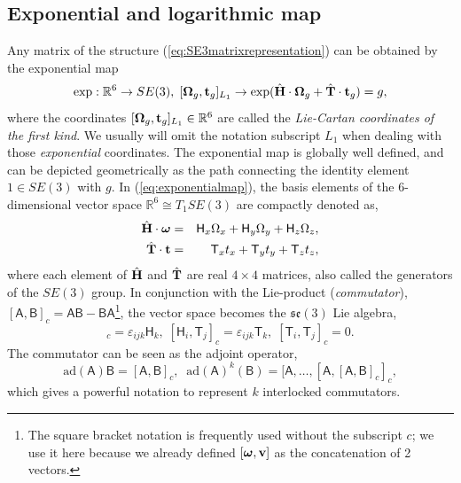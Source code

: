 \documentclass[journal]{IEEEtran}
\newcommand{\real}{\mathbb{R}}
\newcommand{\bfomega}{\boldsymbol{\omega}}
\newcommand{\bfOmega}{\boldsymbol{\Omega}}
\newcommand{\adj}[1]{\mathrm{ad}({#1})}
\newcommand{\beq}{\begin{equation}}
\newcommand{\eeq}{\end{equation}}
\begin{document}
\subsection{Exponential and logarithmic map}
\label{app:expmap}
Any matrix of the structure (\ref{eq:SE3matrixrepresentation}) can be obtained
by the exponential map
\beq
    \exp: \real^6 \rightarrow SE(3),\;
    [\bfOmega_g, {\bf t}_g]_{L_1} \rightarrow
    \exp( \hat{\bf H}\cdot\bfOmega_g + \hat{\bf T}\cdot{\bf t}_g ) = g,
    \label{eq:exponentialmap}
\eeq
where the coordinates $[\bfOmega_g,{\bf t}_g]_{L_1} \in \real^6$ are called the
{\em Lie-Cartan coordinates of the first kind}. We usually will omit the notation subscript
$L_1$ when dealing with those {\em exponential} coordinates. The exponential map is globally well defined,
and can be depicted geometrically as the path connecting the identity element $1\in SE(3)$ with
$g$. In (\ref{eq:exponentialmap}), the basis elements
of the 6-dimensional vector space $\real^6\cong T_1SE(3)$ are compactly denoted as,
\begin{eqnarray}
    \hat{\bf H}\cdot\bfomega&=&\mathsf{H}_x\Omega_x+\mathsf{H}_y\Omega_y+\mathsf{H}_z\Omega_z,\nonumber\\
    \hat{\bf T}\cdot{\bf t} &=&\mathsf{T}_x t_x + \mathsf{T}_y t_y + \mathsf{T}_z t_z,
    \label{eq:generatingmatrices}
\end{eqnarray}
where each element of $\hat{\bf H}$ and $\hat{\bf T}$ are real $4\times 4$ matrices,
also called the generators of the $SE(3)$ group. In conjunction with the Lie-product
({\em commutator}), $[\mathsf{A},\mathsf{B}]_c = \mathsf{AB}-\mathsf{BA}$\footnote{The square bracket
notation is frequently used without the subscript $c$; we use it here because we already
defined $[{\bfomega},{\bf v}]$ as the concatenation of 2 vectors.},
the vector space becomes the $\mathfrak{se}(3)$ Lie algebra,
\beq
    [\mathsf{H}_i,\mathsf{H}_j]_c = \varepsilon_{ijk}\mathsf{H}_k,\;
    [\mathsf{H}_i,\mathsf{T}_j]_c = \varepsilon_{ijk}\mathsf{T}_k,\;
    [\mathsf{T}_i, \mathsf{T}_j]_c = 0. \label{eq:commutatortable}
\eeq
The commutator can be seen as the adjoint operator,
\beq
    \adj{\mathsf{A}} \mathsf{B} = [\mathsf{A},\mathsf{B}]_c, \;\;
    \adj{\mathsf{A}}^k(\mathsf{B}) = [\mathsf{A},\ldots,[\mathsf{A},[\mathsf{A},\mathsf{B}]_c]_c,
    \label{eq:defadjoint}
\eeq
which gives a powerful notation to represent $k$ interlocked commutators.
\end{document}
